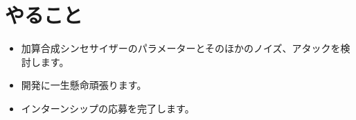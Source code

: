 \documentclass[a4paper, 12pt]{article}
\begin{document}




\section*{やること}
\begin{itemize}
    \item 加算合成シンセサイザーのパラメーターとそのほかのノイズ、アタックを検討します。
    \item 開発に一生懸命頑張ります。
    \item インターンシップの応募を完了します。
\end{itemize}



\end{document}
